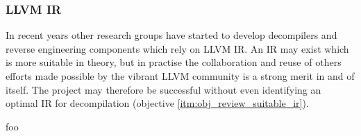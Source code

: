 
\subsubsection{LLVM IR}

\cite{llvm_lang_ref}
\cite{ssa_for_decomp}




In recent years other research groups have started to develop decompilers \cite{decomp_of_llvm,retargetable_decomp} and reverse engineering components \cite{mcsema} which rely on LLVM IR. An IR may exist which is more suitable in theory, but in practise the collaboration and reuse of others efforts made possible by the vibrant LLVM community is a strong merit in and of itself. The project may therefore be successful without even identifying an optimal IR for decompilation (objective \ref{itm:obj_review_suitable_ir}).

foo

